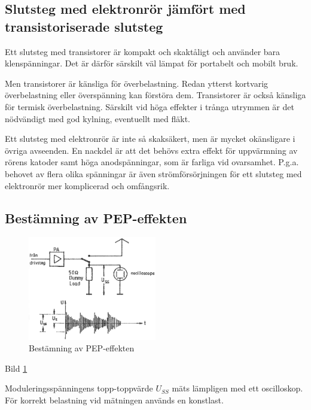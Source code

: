 \subsection{Slutsteg med elektronrör jämfört med transistoriserade slutsteg}

Ett slutsteg med transistorer är kompakt och skaktåligt och använder
bara klenspänningar. Det är därför särskilt väl lämpat för portabelt
och mobilt bruk.

Men transistorer är känsliga för överbelastning. Redan ytterst
kortvarig överbelastning eller överspänning kan förstöra dem.
Transistorer är också känsliga för termisk överbelastning. Särskilt
vid höga effekter i trånga utrymmen är det nödvändigt med god kylning,
eventuellt med fläkt.

Ett slutsteg med elektronrör är inte så skaksäkert, men är mycket
okänsligare i övriga avseenden. En nackdel är att det behövs extra
effekt för uppvärmning av rörens katoder samt höga anodspänningar, som
är farliga vid ovarsamhet. P.g.a. behovet av flera olika spänningar är
även strömförsörjningen för ett slutsteg med elektronrör mer
komplicerad och omfångsrik.

\subsection{Bestämning av PEP-effekten}

\begin{figure}
\includegraphics[width=0.5\textwidth]{images/cropped_pdfs/bild_2_3-52.pdf}
\caption{Bestämning av PEP-effekten}
\label{fig:BildII3-52}
\end{figure}

Bild \ref{fig:BildII3-52}

Moduleringsspänningens topp-topp\-värde \(U_{SS}\) mäts lämpligen med
ett oscilloskop. För korrekt belastning vid mätningen används en
konstlast.

